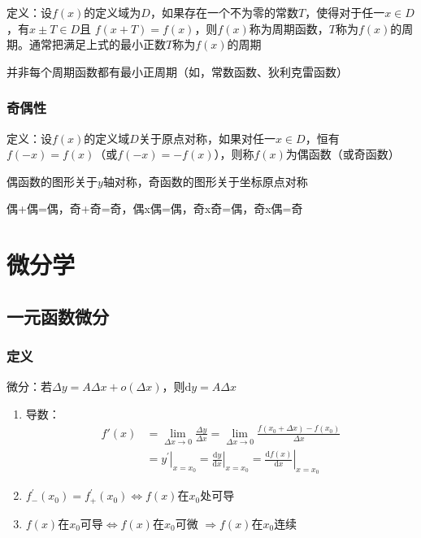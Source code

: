 \documentclass[12pt]{book}
\begin{document}
定义：设$f(x)$的定义域为$D$，如果存在一个不为零的常数$T$，使得对于任一$ x \in D$，有$x\pm T\in D$且 $f(x+T)= f(x)$，则$f(x)$称为周期函数，$T$称为$f(x)$的周期。通常把满足上式的最小正数$T$称为$f(x)$的周期


并非每个周期函数都有最小正周期（如，常数函数、狄利克雷函数）

\subsection{奇偶性}

定义：设$f(x)$的定义域$D$关于原点对称，如果对任一$x\in D$，恒有$f(-x)=f(x)$（或$ f(-x)=- f(x)$），则称$f(x)$为偶函数（或奇函数）


偶函数的图形关于$y$轴对称，奇函数的图形关于坐标原点对称

偶+偶=偶，奇+奇=奇，偶x偶=偶，奇x奇=偶，奇x偶=奇
















\chapter{微分学}

\section{一元函数微分}



\subsection{定义}

微分：若$\Delta y =A \Delta x +o(\Delta x) $，则$ \mathrm{d} y = A \Delta x $

\begin{enumerate}[1.]
    \item 导数：
          \begin{align*}
              f'(x) & = \lim_{\Delta x\rightarrow 0}{\frac{\Delta y}{\Delta x}} = \lim_{\Delta x\rightarrow 0}{\frac{f(x_0+\Delta x)-f(x_0)}{\Delta x}} \\
              & = \left.y^\prime \right|_{x=x_0}  
              =\left.\frac{\mathrm{d}y}{\mathrm{d}x} \right|_{x=x_0} = \left.\frac{\mathrm{d}f(x)}{\mathrm{d}x} \right|_{x=x_0}
          \end{align*}
    \item $f^\prime_{-}(x_0)=f^\prime_{+}(x_0)\Leftrightarrow f(x)$在$x_0$处可导
    \item $f(x)$在$x_0$可导$\Leftrightarrow f(x)$在$x_0$可微 $\Rightarrow f(x)$在$x_0$连续
\end{enumerate}
\end{document}
